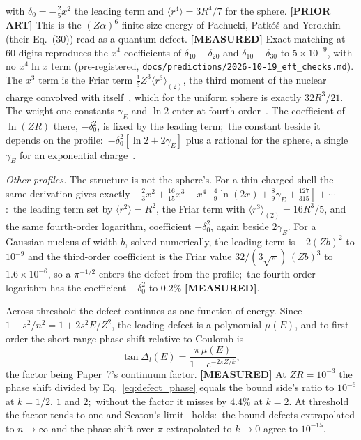 \documentclass[twocolumn,prc,amsmath,amssymb,superscriptaddress]{revtex4-2}
\begin{document}
with $\delta_0 = -\tfrac25 x^2$ the leading term and $\langle r^4\rangle = 3R^4/7$ for the sphere. \textbf{[PRIOR ART]} This is the $(Z\alpha)^6$ finite-size energy of Pachucki, Patk\'o\v{s} and Yerokhin~\cite{PPY2025} (their Eq.~(30)) read as a quantum defect. \textbf{[MEASURED]} Exact matching at 60 digits reproduces the $x^4$ coefficients of $\delta_{10} - \delta_{20}$ and $\delta_{10} - \delta_{30}$ to $5\times 10^{-9}$, with no $x^4\ln x$ term (pre-registered, \texttt{docs/predictions/2026-10-19\_eft\_checks.md}). The $x^3$ term is the Friar term $\tfrac13 Z^3\langle r^3\rangle_{(2)}$, the third moment of the nuclear charge convolved with itself~\cite{Friar1979}, which for the uniform sphere is exactly $32R^3/21$. The weight-one constants $\gamma_E$ and $\ln 2$ enter at fourth order~\cite{PPY2025}. The coefficient of $\ln(ZR)$ there, $-\delta_0^2$, is fixed by the leading term;\ the constant beside it depends on the profile:\ $-\delta_0^2[\ln 2 + 2\gamma_E]$ plus a rational for the sphere, a single $\gamma_E$ for an exponential charge~\cite{PPY2025}.

\emph{Other profiles.} The structure is not the sphere's. For a thin charged shell the same derivation gives exactly $-\tfrac23 x^2 + \tfrac{16}{15}x^3 - x^4[\tfrac49\ln(2x) + \tfrac89\gamma_E + \tfrac{127}{315}] + \cdots$:\ the leading term set by $\langle r^2\rangle = R^2$, the Friar term with $\langle r^3\rangle_{(2)} = 16R^3/5$, and the same fourth-order logarithm, coefficient $-\delta_0^2$, again beside $2\gamma_E$. For a Gaussian nucleus of width $b$, solved numerically, the leading term is $-2(Zb)^2$ to $10^{-9}$ and the third-order coefficient is the Friar value $32/(3\sqrt\pi)\,(Zb)^3$ to $1.6\times 10^{-6}$, so a $\pi^{-1/2}$ enters the defect from the profile;\ the fourth-order logarithm has the coefficient $-\delta_0^2$ to $0.2\%$ \textbf{[MEASURED]}.

Across threshold the defect continues as one function of energy. Since $1 - s^2/n^2 = 1 + 2s^2E/Z^2$, the leading defect is a polynomial $\mu(E)$, and to first order the short-range phase shift relative to Coulomb is
\begin{equation}
\tan\Delta_l(E) = \frac{\pi\,\mu(E)}{1 - e^{-2\pi Z/k}} ,
\label{eq:defect_phase}
\end{equation}
the factor being Paper~7's continuum factor. \textbf{[MEASURED]} At $ZR = 10^{-3}$ the phase shift divided by Eq.~\eqref{eq:defect_phase} equals the bound side's ratio to $10^{-6}$ at $k = 1/2$, $1$ and $2$;\ without the factor it misses by $4.4\%$ at $k = 2$. At threshold the factor tends to one and Seaton's limit~\cite{Seaton1983} holds:\ the bound defects extrapolated to $n \to \infty$ and the phase shift over $\pi$ extrapolated to $k \to 0$ agree to $10^{-15}$.
\end{document}
